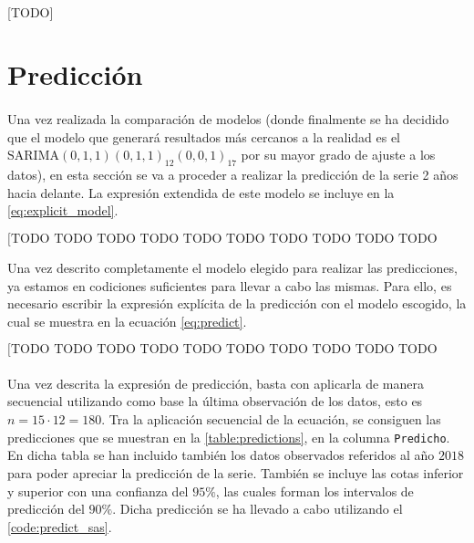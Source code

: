\documentclass[a4paper, spanish]{article}
\begin{document}
    \paragraph{}
    [TODO]

  \section{Predicción}
  \label{sec:prediction}

    \paragraph{}
    Una vez realizada la comparación de modelos (donde finalmente se ha decidido que el modelo que generará resultados más cercanos a la realidad es el \textbf{$\text{SARIMA}(0, 1, 1)(0, 1, 1)_{12}(0, 0, 1)_{17}$} por su mayor grado de ajuste a los datos), en esta sección se va a proceder a realizar la predicción de la serie 2 años hacia delante. La expresión extendida de este modelo se incluye en la \autoref{eq:explicit_model}.

    \begin{equation}
    \label{eq:explicit_model}
      \text{[TODO TODO TODO TODO TODO TODO TODO TODO TODO TODO TODO ]}
    \end{equation}

    Una vez descrito completamente el modelo elegido para realizar las predicciones, ya estamos en codiciones suficientes para llevar a cabo las mismas. Para ello, es necesario escribir la expresión explícita de la predicción con el modelo escogido, la cual se muestra en la ecuación \autoref{eq:predict}.

    \begin{equation}
    \label{eq:predict}
      \text{[TODO TODO TODO TODO TODO TODO TODO TODO TODO TODO TODO ]}
    \end{equation}

    \paragraph{}
    Una vez descrita la expresión de predicción, basta con aplicarla de manera secuencial utilizando como base la última observación de los datos, esto es $n = 15 \cdot 12 = 180$. Tra la aplicación secuencial de la ecuación, se consiguen las predicciones que se muestran en la \autoref{table:predictions}, en la columna \texttt{Predicho}. En dicha tabla se han incluido también los datos observados referidos al año $2018$ para poder apreciar la predicción de la serie. También se incluye las cotas inferior y superior con una confianza del $95\%$, las cuales forman los intervalos de predicción del $90\%$. Dicha predicción se ha llevado a cabo utilizando el \autoref{code:predict_sas}.
\end{document}
